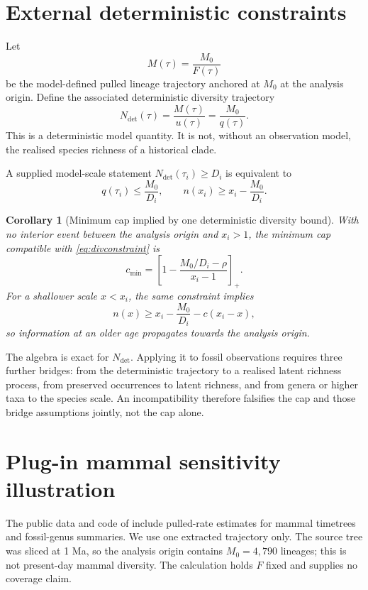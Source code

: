 \documentclass[11pt]{article}
\newtheorem{corollary}[theorem]{Corollary}
\theoremstyle{definition}
\begin{document}
\section{External deterministic constraints}
Let
\begin{equation}
 M(\tau)=\frac{M_0}{F(\tau)} \label{eq:M}
\end{equation}
be the model-defined pulled lineage trajectory anchored at $M_0$ at the analysis origin. Define the associated deterministic diversity trajectory
\begin{equation}
 N_{\mathrm{det}}(\tau)=\frac{M(\tau)}{u(\tau)}=\frac{M_0}{q(\tau)}. \label{eq:Ndet}
\end{equation}
This is a deterministic model quantity. It is not, without an observation model, the realised species richness of a historical clade.

A supplied model-scale statement $N_{\mathrm{det}}(\tau_i)\geq D_i$ is equivalent to
\begin{equation}
 q(\tau_i)\leq\frac{M_0}{D_i},\qquad
 n(x_i)\geq x_i-\frac{M_0}{D_i}. \label{eq:divconstraint}
\end{equation}

\begin{corollary}[Minimum cap implied by one deterministic diversity bound]\label{cor:diversity}
With no interior event between the analysis origin and $x_i>1$, the minimum cap compatible with \eqref{eq:divconstraint} is
\begin{equation}
 c_{\min}=\left[1-\frac{M_0/D_i-\rho}{x_i-1}\right]_+. \label{eq:diversitycap}
\end{equation}
For a shallower scale $x<x_i$, the same constraint implies
\begin{equation}
 n(x)\geq x_i-\frac{M_0}{D_i}-c(x_i-x), \label{eq:backprop}
\end{equation}
so information at an older age propagates towards the analysis origin.
\end{corollary}

The algebra is exact for $N_{\mathrm{det}}$. Applying it to fossil observations requires three further bridges: from the deterministic trajectory to a realised latent richness process, from preserved occurrences to latent richness, and from genera or higher taxa to the species scale. An incompatibility therefore falsifies the cap and those bridge assumptions jointly, not the cap alone.

\section{Plug-in mammal sensitivity illustration}
The public data and code of \textcite{upham2021} include pulled-rate estimates for mammal timetrees and fossil-genus summaries. We use one extracted trajectory only. The source tree was sliced at 1 Ma, so the analysis origin contains $M_0=4{,}790$ lineages; this is not present-day mammal diversity. The calculation holds $F$ fixed and supplies no coverage claim.
\end{document}
